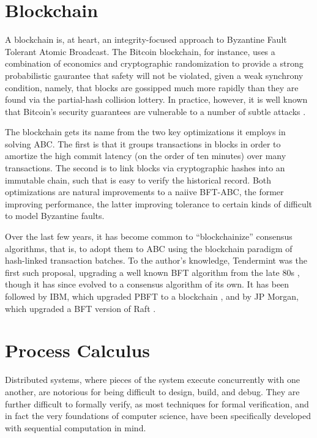 \section{Blockchain}

A blockchain is, at heart, an integrity-focused approach to Byzantine Fault Tolerant Atomic Broadcast.
The Bitcoin blockchain, for instance, uses a combination of economics and cryptographic randomization 
to provide a strong probabilistic gaurantee that safety will not be violated, 
given a weak synchrony condition, namely, 
that blocks are gossipped much more rapidly than they are found via the partial-hash collision lottery.
In practice, however, it is well known that Bitcoin's security guarantees are vulnerable to a number 
of subtle attacks \cite{courtois2014subversive,eyal2014majority}.


The blockchain gets its name from the two key optimizations it employs in solving ABC.
The first is that it groups transactions in blocks in order to amortize the high commit latency 
(on the order of ten minutes) over many transactions.
The second is to link blocks via cryptographic hashes into an immutable chain,
such that is easy to verify the historical record.
Both optimizations are natural improvements to a naiive BFT-ABC,
the former improving performance, the latter improving tolerance to certain kinds 
of difficult to model Byzantine faults.

Over the last few years, it has become common to ``blockchainize'' consensus algorithms,
that is, to adopt them to ABC using the blockchain paradigm of hash-linked transaction batches.
To the author's knowledge, Tendermint was the first such proposal, 
upgrading a well known BFT algorithm from the late 80s \cite{dls},
though it has since evolved to a consensus algorithm of its own.
It has been followed by IBM, which upgraded PBFT to a blockchain \cite{cachin2016non,obc},
and by JP Morgan, which upgraded a BFT version of Raft \cite{juno}.

\section{Process Calculus}

Distributed systems, where pieces of the system execute concurrently with one another,
are notorious for being difficult to design, build, and debug.
They are further difficult to formally verify, 
as most techniques for formal verification, and in fact the very foundations of computer science,
have been specifically developed with sequential computation in mind.

